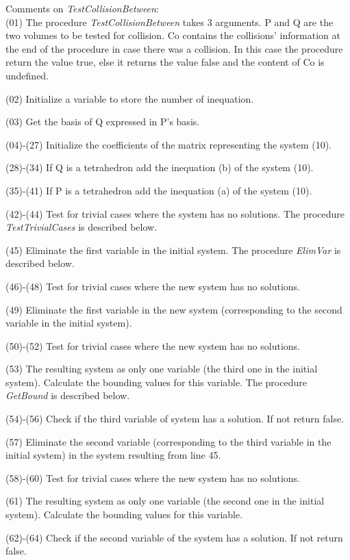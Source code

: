 \documentclass[12pt, a4paper]{article}
\begin{document}
Comments on {\em TestCollisionBetween}:\\

(01) The procedure {\em TestCollisionBetween} takes 3 arguments. P and Q are the two volumes to be tested for collision. Co contains the collisions' information at the end of the procedure in case there was a collision. In this case the procedure return the value true, else it returns the value false and the content of Co is undefined.

(02) Initialize a variable to store the number of inequation.

(03) Get the basis of Q expressed in P's basis.

(04)-(27) Initialize the coefficients of the matrix representing the system (10).

(28)-(34) If Q is a tetrahedron add the inequation (b) of the system (10).

(35)-(41) If P is a tetrahedron add the inequation (a) of the system (10).

(42)-(44) Test for trivial cases where the system has no solutions. The procedure {\em TestTrivialCases} is described below.

(45) Eliminate the first variable in the initial system. The procedure {\em ElimVar} is described below.

(46)-(48) Test for trivial cases where the new system has no solutions.

(49) Eliminate the first variable in the new system (corresponding to the second variable in the initial system).

(50)-(52) Test for trivial cases where the new system has no solutions.

(53) The resulting system as only one variable (the third one in the initial system). Calculate the bounding values for this variable. The procedure {\em GetBound} is described below.

(54)-(56) Check if the third variable of system has a solution. If not return false.

(57) Eliminate the second variable (corresponding to the third variable in the initial system) in the system resulting from line 45.

(58)-(60) Test for trivial cases where the new system has no solutions.

(61) The resulting system as only one variable (the second one in the initial system). Calculate the bounding values for this variable.

(62)-(64) Check if the second variable of the system has a solution. If not return false.
\end{document}
